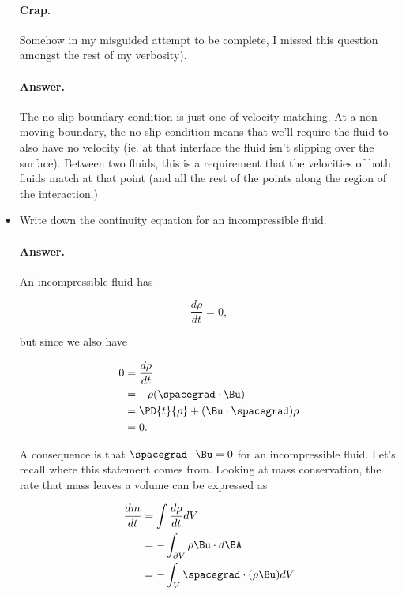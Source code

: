 \begin{itemize}
\paragraph{Crap.} Somehow in my misguided attempt to be complete, I missed this question amongst the rest of my verbosity).

\paragraph{Answer.}
The no slip boundary condition is just one of velocity matching.  At a non-moving boundary, the no-slip condition means that we'll require the fluid to also have no velocity (ie. at that interface the fluid isn't slipping over the surface).  Between two fluids, this is a requirement that the velocities of both fluids match at that point (and all the rest of the points along the region of the interaction.)

\item Write down the continuity equation for an incompressible fluid.
\paragraph{Answer.}

An incompressible fluid has

\begin{equation}\label{eqn:continuumMidTermReflection:210}
\frac{d\rho}{dt} = 0,
\end{equation}

but since we also have

\begin{align*}
0 
&=
\frac{d\rho}{dt} \\
&= - \rho (\spacegrad \cdot \Bu)  \\
&= 
\PD{t}{\rho} + (\Bu \cdot \spacegrad) \rho \\
&= 0.
\end{align*}

A consequence is that $\spacegrad \cdot \Bu = 0$ for an incompressible fluid.  Let's recall where this statement comes from.  Looking at mass conservation, the rate that mass leaves a volume can be expressed as

\begin{align*}
\frac{dm}{dt}
&= \int \frac{d\rho}{dt} dV \\
&= -\int_{\partial V} \rho \Bu \cdot d\BA \\
&= -\int_V \spacegrad \cdot (\rho \Bu) dV
\end{align*}


\end{itemize}
